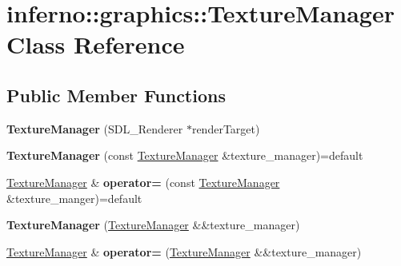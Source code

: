 \hypertarget{classinferno_1_1graphics_1_1_texture_manager}{}\section{inferno\+:\+:graphics\+:\+:Texture\+Manager Class Reference}
\label{classinferno_1_1graphics_1_1_texture_manager}
\subsection*{Public Member Functions}
\begin{DoxyCompactItemize}
\item 
\mbox{\label{classinferno_1_1graphics_1_1_texture_manager_a06e141712b3786bae5100da3e04aff92}} 
{\bfseries Texture\+Manager} (S\+D\+L\+\_\+\+Renderer $\ast$render\+Target)
\item 
\mbox{\label{classinferno_1_1graphics_1_1_texture_manager_ab6d374761b5535d511a9b89259d62f33}} 
{\bfseries Texture\+Manager} (const \mbox{\hyperlink{classinferno_1_1graphics_1_1_texture_manager}{Texture\+Manager}} \&texture\+\_\+manager)=default
\item 
\mbox{\label{classinferno_1_1graphics_1_1_texture_manager_a504d68f0a53e92bd3c23ad2c544e0964}} 
\mbox{\hyperlink{classinferno_1_1graphics_1_1_texture_manager}{Texture\+Manager}} \& {\bfseries operator=} (const \mbox{\hyperlink{classinferno_1_1graphics_1_1_texture_manager}{Texture\+Manager}} \&texture\+\_\+manger)=default
\item 
\mbox{\label{classinferno_1_1graphics_1_1_texture_manager_a91ac9443d92df72ecedee3cf16401965}} 
{\bfseries Texture\+Manager} (\mbox{\hyperlink{classinferno_1_1graphics_1_1_texture_manager}{Texture\+Manager}} \&\&texture\+\_\+manager)
\item 
\mbox{\label{classinferno_1_1graphics_1_1_texture_manager_ac413011a070590a960995b21eb4e3fdb}} 
\mbox{\hyperlink{classinferno_1_1graphics_1_1_texture_manager}{Texture\+Manager}} \& {\bfseries operator=} (\mbox{\hyperlink{classinferno_1_1graphics_1_1_texture_manager}{Texture\+Manager}} \&\&texture\+\_\+manager)

\end{DoxyCompactItemize}
